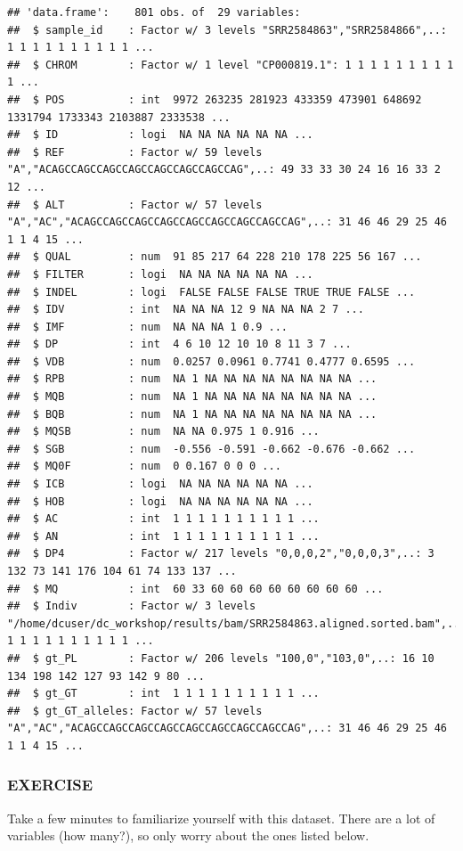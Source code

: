 \documentclass[]{book}
\begin{document}
\begin{verbatim}
## 'data.frame':    801 obs. of  29 variables:
##  $ sample_id    : Factor w/ 3 levels "SRR2584863","SRR2584866",..: 1 1 1 1 1 1 1 1 1 1 ...
##  $ CHROM        : Factor w/ 1 level "CP000819.1": 1 1 1 1 1 1 1 1 1 1 ...
##  $ POS          : int  9972 263235 281923 433359 473901 648692 1331794 1733343 2103887 2333538 ...
##  $ ID           : logi  NA NA NA NA NA NA ...
##  $ REF          : Factor w/ 59 levels "A","ACAGCCAGCCAGCCAGCCAGCCAGCCAGCCAG",..: 49 33 33 30 24 16 16 33 2 12 ...
##  $ ALT          : Factor w/ 57 levels "A","AC","ACAGCCAGCCAGCCAGCCAGCCAGCCAGCCAGCCAG",..: 31 46 46 29 25 46 1 1 4 15 ...
##  $ QUAL         : num  91 85 217 64 228 210 178 225 56 167 ...
##  $ FILTER       : logi  NA NA NA NA NA NA ...
##  $ INDEL        : logi  FALSE FALSE FALSE TRUE TRUE FALSE ...
##  $ IDV          : int  NA NA NA 12 9 NA NA NA 2 7 ...
##  $ IMF          : num  NA NA NA 1 0.9 ...
##  $ DP           : int  4 6 10 12 10 10 8 11 3 7 ...
##  $ VDB          : num  0.0257 0.0961 0.7741 0.4777 0.6595 ...
##  $ RPB          : num  NA 1 NA NA NA NA NA NA NA NA ...
##  $ MQB          : num  NA 1 NA NA NA NA NA NA NA NA ...
##  $ BQB          : num  NA 1 NA NA NA NA NA NA NA NA ...
##  $ MQSB         : num  NA NA 0.975 1 0.916 ...
##  $ SGB          : num  -0.556 -0.591 -0.662 -0.676 -0.662 ...
##  $ MQ0F         : num  0 0.167 0 0 0 ...
##  $ ICB          : logi  NA NA NA NA NA NA ...
##  $ HOB          : logi  NA NA NA NA NA NA ...
##  $ AC           : int  1 1 1 1 1 1 1 1 1 1 ...
##  $ AN           : int  1 1 1 1 1 1 1 1 1 1 ...
##  $ DP4          : Factor w/ 217 levels "0,0,0,2","0,0,0,3",..: 3 132 73 141 176 104 61 74 133 137 ...
##  $ MQ           : int  60 33 60 60 60 60 60 60 60 60 ...
##  $ Indiv        : Factor w/ 3 levels "/home/dcuser/dc_workshop/results/bam/SRR2584863.aligned.sorted.bam",..: 1 1 1 1 1 1 1 1 1 1 ...
##  $ gt_PL        : Factor w/ 206 levels "100,0","103,0",..: 16 10 134 198 142 127 93 142 9 80 ...
##  $ gt_GT        : int  1 1 1 1 1 1 1 1 1 1 ...
##  $ gt_GT_alleles: Factor w/ 57 levels "A","AC","ACAGCCAGCCAGCCAGCCAGCCAGCCAGCCAGCCAG",..: 31 46 46 29 25 46 1 1 4 15 ...
\end{verbatim}

\hypertarget{exercise-22}{%
\subsubsection*{EXERCISE}\label{exercise-22}}

Take a few minutes to familiarize yourself with this dataset. There are a lot of variables (how many?), so only worry about the ones listed below.
\end{document}
